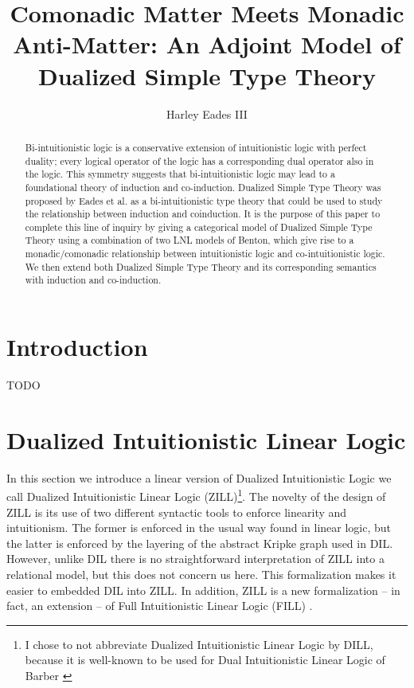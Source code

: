 \documentclass[letterpaper,USenglish]{lipics-v2016}
\date{}
\title{Comonadic Matter Meets Monadic Anti-Matter: An Adjoint Model of Dualized Simple Type Theory}
\author{Harley Eades III}
\affil{Computer and Information Sciences, Augusta University,
  Augusta, GA, \texttt{heades@augusta.edu}}
\begin{document}
\maketitle 

\begin{abstract}
  Bi-intuitionistic logic is a conservative extension of
  intuitionistic logic with perfect duality; every logical operator of
  the logic has a corresponding dual operator also in the logic.  This
  symmetry suggests that bi-intuitionistic logic may lead to a
  foundational theory of induction and co-induction.  Dualized Simple
  Type Theory was proposed by Eades et al. as a bi-intuitionistic type
  theory that could be used to study the relationship between
  induction and coinduction.  It is the purpose of this paper to
  complete this line of inquiry by giving a categorical model of
  Dualized Simple Type Theory using a combination of two LNL models of
  Benton, which give rise to a monadic/comonadic relationship between
  intuitionistic logic and co-intuitionistic logic.  We then extend
  both Dualized Simple Type Theory and its corresponding semantics
  with induction and co-induction.
\end{abstract}

\section{Introduction}
\label{sec:introduction}
TODO \cite{?}

\section{Dualized Intuitionistic Linear Logic}
\label{sec:linear_dualized_type_theory}
In this section we introduce a linear version of Dualized
Intuitionistic Logic we call Dualized Intuitionistic Linear Logic
(ZILL)\footnote{I chose to not abbreviate Dualized Intuitionistic
  Linear Logic by DILL, because it is well-known to be used for Dual
  Intuitionistic Linear Logic of Barber \cite{?}}.  The novelty of the
design of ZILL is its use of two different syntactic tools to enforce
linearity and intuitionism. The former is enforced in the usual way
found in linear logic, but the latter is enforced by the layering of
the abstract Kripke graph used in DIL.  However, unlike DIL there is
no straightforward interpretation of ZILL into a relational model, but
this does not concern us here.  This formalization makes it easier to
embedded DIL into ZILL.  In addition, ZILL is a new formalization --
in fact, an extension -- of Full Intuitionistic Linear Logic (FILL)
\cite{Eades:2016}.
\end{document}
